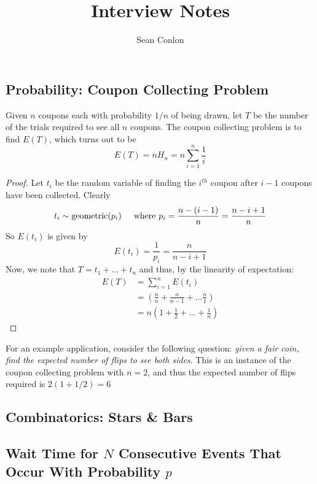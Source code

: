 \documentclass{article}
\title{Interview Notes}
\author{Sean Conlon}
\begin{document}
\maketitle

\newpage
\subsection*{Probability: Coupon Collecting Problem}
Given $n$ coupons each with probability $1/n$ of being drawn, let $T$ be the number of the trials required to see all $n$ coupons. The coupon collecting problem is to find $E(T)$, which turns out to be 
$$E(T) = n H_n = n \sum_{i=1}^{n}\frac{1}{i}$$
\begin{proof}
    Let $t_i$ be the random variable of finding the $i^{th}$ coupon after $i-1$ coupons have been collected. Clearly
    $$t_i \sim \text{geometric}(p_i) \hspace{5mm} \text{where } p_i = \frac{n-(i-1)}{n} = \frac{n-i+1}{n}$$
    So $E(t_i)$ is given by 
    $$E(t_i) = \frac{1}{p_i} = \frac{n}{n-i+1}$$
    Now, we note that $T = t_1 + \dots + t_n$ and thus, by the linearity of expectation: 
    \begin{align*}
        E(T) &= \sum_{i=1}^{n}E(t_i) \\
        &= \left(\frac{n}{n} + \frac{n}{n-1} + \dots \frac{n}{1} \right) \\
        &= n\left(1 + \frac{1}{2} + \dots + \frac{1}{n} \right)
    \end{align*}
\end{proof}
For an example application, consider the following question: \textit{given a fair coin, find the expected number of flips to see both sides}. This is an instance of the coupon collecting problem with $n=2$, and thus the expected number of flips required is $2(1+1/2) = 6$


\subsection*{Combinatorics: Stars \& Bars}


\newpage
\subsection*{Wait Time for $N$ Consecutive Events That Occur With Probability $p$}
\end{document}
